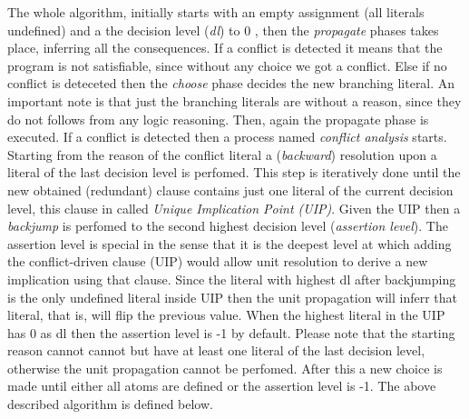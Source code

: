 The whole algorithm, initially starts with an empty assignment (all literals undefined)
and a the decision level (\textit{dl}) to 0  ,
then the \textit{propagate} phases takes place, inferring all the consequences.
If a conflict is detected it means that the program is not satisfiable, since 
without any choice we got a conflict.
Else if no conflict is deteceted then the \textit{choose} phase decides the new branching literal.
An important note is that just the branching literals are without a reason, since they 
do not follows from any logic reasoning.
Then, again the propagate phase is executed.
If a conflict is detected then a process named \textit{conflict analysis} starts.
Starting from the reason of the conflict literal a (\textit{backward}) resolution upon a literal of the last
decision level is perfomed. This step is iteratively done until the new obtained (redundant) clause 
contains just one literal of the current decision level, this clause in called
\textit{Unique Implication Point (UIP)}.
Given the UIP then a \textit{backjump} is perfomed to the second highest decision level
(\textit{assertion level}). The assertion level is special in the sense that it is the deepest level
at which adding the conﬂict-driven clause (UIP) would allow unit resolution to derive
a new implication using that clause. Since the literal with highest dl after backjumping 
is the only undefined literal inside UIP then the unit propagation will inferr that literal,
that is, will flip the previous value.
When the highest literal in the UIP has 0 as dl then the assertion level is -1 by default.
Please note that the starting reason cannot cannot but have at least one literal of the last decision 
level, otherwise the unit propagation cannot be perfomed.
After this a new choice is made until either all atoms are defined or the
assertion level is -1.
The above described algorithm is defined below.
